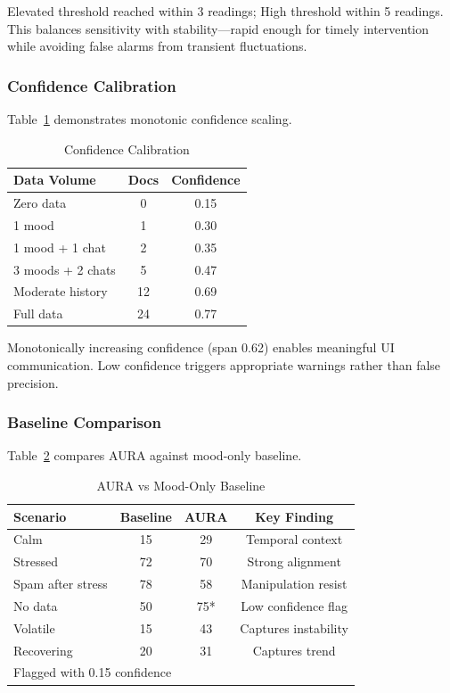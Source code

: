 \documentclass[journal]{IEEEtran}
\begin{document}
Elevated threshold reached within 3 readings; High threshold within 5 readings. This balances sensitivity with stability—rapid enough for timely intervention while avoiding false alarms from transient fluctuations.

\subsubsection{Confidence Calibration}

Table~\ref{tab:confidence} demonstrates monotonic confidence scaling.

\begin{table}[htbp]
\caption{Confidence Calibration}
\label{tab:confidence}
\centering
\begin{tabular}{lcc}
\toprule
\textbf{Data Volume} & \textbf{Docs} & \textbf{Confidence} \\
\midrule
Zero data & 0 & 0.15 \\
1 mood & 1 & 0.30 \\
1 mood + 1 chat & 2 & 0.35 \\
3 moods + 2 chats & 5 & 0.47 \\
Moderate history & 12 & 0.69 \\
Full data & 24 & 0.77 \\
\bottomrule
\end{tabular}
\end{table}

Monotonically increasing confidence (span 0.62) enables meaningful UI communication. Low confidence triggers appropriate warnings rather than false precision.

\subsubsection{Baseline Comparison}

Table~\ref{tab:baseline} compares AURA against mood-only baseline.

\begin{table}[htbp]
\caption{AURA vs Mood-Only Baseline}
\label{tab:baseline}
\centering
\begin{tabular}{lccc}
\toprule
\textbf{Scenario} & \textbf{Baseline} & \textbf{AURA} & \textbf{Key Finding} \\
\midrule
Calm & 15 & 29 & Temporal context \\
Stressed & 72 & 70 & Strong alignment \\
Spam after stress & 78 & 58 & Manipulation resist \\
No data & 50 & 75* & Low confidence flag \\
Volatile & 15 & 43 & Captures instability \\
Recovering & 20 & 31 & Captures trend \\
\bottomrule
\multicolumn{4}{l}{\small *Flagged with 0.15 confidence}
\end{tabular}
\end{table}
\end{document}
